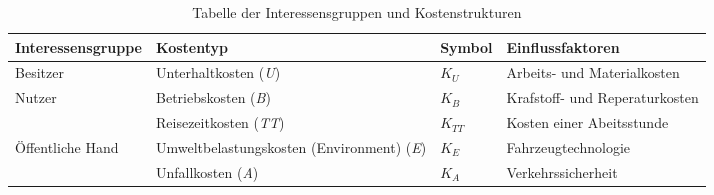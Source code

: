 %
%
%
%

\begin{table}[h!]
\flushleft
\renewcommand{\arraystretch}{1.4}
%
%
\begin{tabular}{@{}p{3.3cm} p{4cm} p{1cm} l @{}} \\   
\toprule
\textbf{Interessensgruppe} & \textbf{Kostentyp} & \textbf{Symbol} & \textbf{Einflussfaktoren} 			\\
\midrule
Besitzer                   & Unterhaltkosten (\textit{U})                    		& $K_{U}$    & Arbeits- und Materialkosten              \\
Nutzer		               & Betriebskosten (\textit{B})                     		& $K_{B}$    & Krafstoff- und Reperaturkosten                     \\
                           & Reisezeitkosten (\textit{TT})            		 		& $K_{TT}$   & Kosten einer Abeitsstunde   \\
Öffentliche Hand           & Umweltbelastungskosten \newline (Environment) (\textit{E}) & $K_{E}$  &  Fahrzeugtechnologie      \\
                           & Unfallkosten (\textit{A})                       		& $K_{A}$    & Verkehrssicherheit    \\
\bottomrule

\end{tabular}
\caption{Tabelle der Interessensgruppen und Kostenstrukturen}
\label{tab:t-04-01-Interessensgruppen}
\end{table}


%


